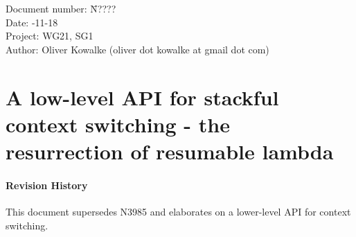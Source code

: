 \documentclass[a4paper,10pt,DIV15]{scrartcl}
\begin{document}
\small
\begin{tabbing}
    Document number: \= N????\\
    Date:            -11-18\\
    Project:         \> WG21, SG1\\
    Author:          \> Oliver Kowalke (oliver dot kowalke at gmail dot com)\\
\end{tabbing}

\section*{A low-level API for stackful context switching - the resurrection of resumable lambda}


\tableofcontents


\paragraph*{Revision History}
This document supersedes N3985 and elaborates on a lower-level API for context
switching.












\end{document}
